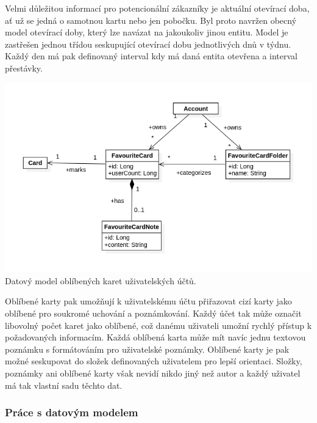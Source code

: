\begin{itemize}
\begin{itemize}
		Velmi důležitou informací pro potencionální zákazníky je aktuální otevírací doba, ať už se jedná o samotnou kartu nebo
		jen pobočku.
		Byl proto navržen obecný model otevírací doby, který lze navázat na jakoukoliv jinou entitu.
		Model je zastřešen jednou třídou seskupující otevírací dobu jednotlivých dnů v týdnu.
		Každý den má pak definovaný interval kdy má daná entita otevřena a interval přestávky.

		\includegraphics[width=0.24\linewidth]{obrazky/datovy_model_oblibene_karty}\hfill
		Datový model oblíbených karet uživatelských účtů.

		Oblíbené karty pak umožňují k uživatelskému účtu přiřazovat cizí karty jako oblíbené pro soukromé uchování a
		poznámkování.
		Každý účet tak může označit libovolný počet karet jako oblíbené, což danému uživateli umožní rychlý přístup
		k požadovaných informacím.
		Každá oblíbená karta může mít navíc jednu textovou poznámku s formátováním pro uživatelské poznámky.
		Oblíbené karty je pak možné seskupovat do složek definovaných uživatelem pro lepší orientaci.
		Složky, poznámky ani oblíbené karty však nevidí nikdo jiný než autor a každý uživatel má tak vlastní sadu těchto dat.

		\subsubsection{Práce s datovým modelem}


\end{itemize}
\end{itemize}
